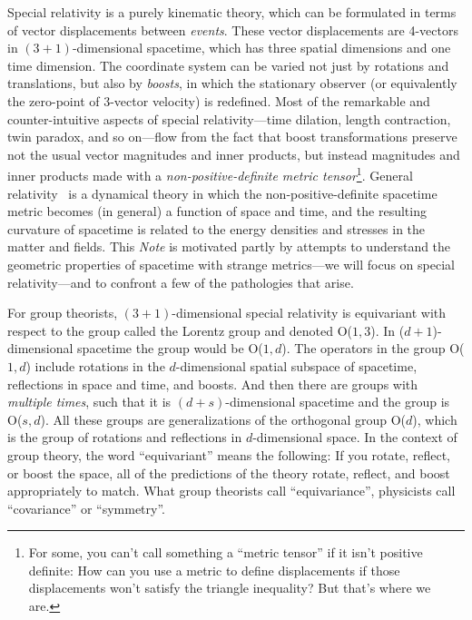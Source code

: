 \documentclass{article}
\newcommand{\plus}{\!+\!} %
\newcommand{\documentname}{\textsl{Note}}
\begin{document}
Special relativity \cite{sr} is a purely kinematic theory, which can be formulated in terms of vector displacements between \emph{events}.
These vector displacements are 4-vectors in $(3\plus1)$-dimensional spacetime, which has three spatial dimensions and one time dimension.
The coordinate system can be varied not just by rotations and translations, but also by \emph{boosts}, in which the stationary observer (or equivalently the zero-point of 3-vector velocity) is redefined.
Most of the remarkable and counter-intuitive aspects of special relativity---time dilation, length contraction, twin paradox, and so on---flow from the fact that boost transformations preserve not the usual vector magnitudes and inner products, but instead magnitudes and inner products made with a \emph{non-positive-definite metric tensor}\footnote{For some, you can't call something a ``metric tensor'' if it isn't positive definite: How can you use a metric to define displacements if those displacements won't satisfy the triangle inequality? But that's where we are.}.
General relativity~\cite{gr} is a dynamical theory in which the non-positive-definite spacetime metric becomes (in general) a function of space and time, and the resulting curvature of spacetime is related to the energy densities and stresses in the matter and fields.
This \documentname{} is motivated partly by attempts to understand the geometric properties of spacetime with strange metrics---we will focus on special relativity---and to confront a few of the pathologies that arise.

For group theorists, $(3\plus1)$-dimensional special relativity is equivariant with respect to the group called the Lorentz group and denoted O($1,3$).
In ($d\plus1$)-dimensional spacetime the group would be O($1,d$).
The operators in the group O($1,d$) include rotations in the $d$-dimensional spatial subspace of spacetime, reflections in space and time, and boosts.
And then there are groups with \emph{multiple times}, such that it is $(d\plus s)$-dimensional spacetime and the group is O($s,d$).
All these groups are generalizations of the orthogonal group O($d$), which is the group of rotations and reflections in $d$-dimensional space.
In the context of group theory, the word ``equivariant'' means the following:
If you rotate, reflect, or boost the space, all of the predictions of the theory rotate, reflect, and boost appropriately to match.
What group theorists call ``equivariance'', physicists call ``covariance'' or ``symmetry''.
\end{document}
